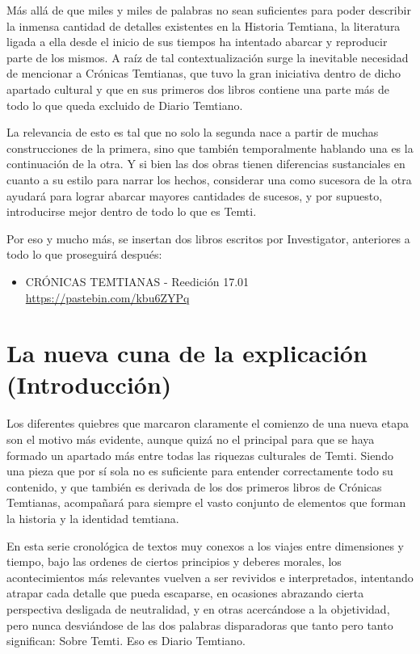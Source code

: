 \documentclass[
]{book}
\providecommand{\tightlist}{%
  \setlength{\itemsep}{0pt}\setlength{\parskip}{0pt}}
\begin{document}
Más allá de que miles y miles de palabras no sean suficientes para poder describir la inmensa cantidad de detalles existentes en la Historia Temtiana, la literatura ligada a ella desde el inicio de sus tiempos ha intentado abarcar y reproducir parte de los mismos. A raíz de tal contextualización surge la inevitable necesidad de mencionar a Crónicas Temtianas, que tuvo la gran iniciativa dentro de dicho apartado cultural y que en sus primeros dos libros contiene una parte más de todo lo que queda excluido de Diario Temtiano.

La relevancia de esto es tal que no solo la segunda nace a partir de muchas construcciones de la primera, sino que también temporalmente hablando una es la continuación de la otra. Y si bien las dos obras tienen diferencias sustanciales en cuanto a su estilo para narrar los hechos, considerar una como sucesora de la otra ayudará para lograr abarcar mayores cantidades de sucesos, y por supuesto, introducirse mejor dentro de todo lo que es Temti.

Por eso y mucho más, se insertan dos libros escritos por Investigator, anteriores a todo lo que proseguirá después:

\begin{itemize}
\tightlist
\item
  CRÓNICAS TEMTIANAS - Reedición 17.01 \url{https://pastebin.com/kbu6ZYPq}
\end{itemize}

\hypertarget{la-nueva-cuna-de-la-explicaciuxf3n-introducciuxf3n}{%
\chapter{La nueva cuna de la explicación (Introducción)}\label{la-nueva-cuna-de-la-explicaciuxf3n-introducciuxf3n}}

Los diferentes quiebres que marcaron claramente el comienzo de una nueva etapa son el motivo más evidente, aunque quizá no el principal para que se haya formado un apartado más entre todas las riquezas culturales de Temti. Siendo una pieza que por sí sola no es suficiente para entender correctamente todo su contenido, y que también es derivada de los dos primeros libros de Crónicas Temtianas, acompañará para siempre el vasto conjunto de elementos que forman la historia y la identidad temtiana.

En esta serie cronológica de textos muy conexos a los viajes entre dimensiones y tiempo, bajo las ordenes de ciertos principios y deberes morales, los acontecimientos más relevantes vuelven a ser revividos e interpretados, intentando atrapar cada detalle que pueda escaparse, en ocasiones abrazando cierta perspectiva desligada de neutralidad, y en otras acercándose a la objetividad, pero nunca desviándose de las dos palabras disparadoras que tanto pero tanto significan: Sobre Temti. Eso es Diario Temtiano.
\end{document}
